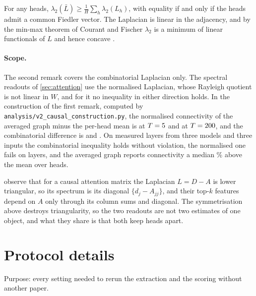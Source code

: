 \begin{remark}
\label{prop:jensen}
For any heads, $\lambda_2(\bar L) \ge \frac1H \sum_h \lambda_2(L_h)$, with equality if and only if the heads admit a common Fiedler vector. The Laplacian is linear in the adjacency, and by the min-max theorem of Courant and Fischer $\lambda_2$ is a minimum of linear functionals of $L$ and hence concave \citep{chung1997spectral}.
\end{remark}

\paragraph{Scope.}
The second remark covers the combinatorial Laplacian only. The spectral readouts of \cref{sec:attention} use the normalised Laplacian, whose Rayleigh quotient is not linear in $W$, and for it no inequality in either direction holds. In the construction of the first remark, computed by \texttt{analysis/v2\_causal\_construction.py}, the normalised connectivity of the averaged graph minus the per-head mean is \ccNormDiffSmall{} at $T=5{}$ and \ccNormDiffLarge{} at $T=200{}$, and the combinatorial difference is \ccCombDiffSmall{} and \ccCombDiffLarge{}. On \jensenLayers{} measured layers from three models and three inputs the combinatorial inequality holds without violation, the normalised one fails on \jensenNormViolations{} layers, and the averaged graph reports connectivity a median \jensenRatioMedianPct{}\% above the mean over heads.

\begin{remark}
\label{rem:lapeig}
\citet{binkowski2025lapeigvals} observe that for a causal attention matrix the Laplacian $L = D - A$ is lower triangular, so its spectrum is its diagonal $\{d_j - A_{jj}\}$, and their top-$k$ features depend on $A$ only through its column sums and diagonal. The symmetrisation above destroys triangularity, so the two readouts are not two estimates of one object, and what they share is that both keep heads apart.
\end{remark}

\section{Protocol details}
\label{app:protocol}

Purpose: every setting needed to rerun the extraction and the scoring without another paper.

